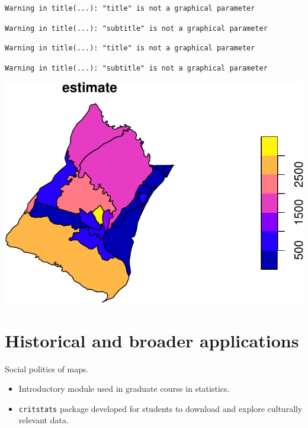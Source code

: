 \documentclass[
  letterpaper,
  DIV=11,
  numbers=noendperiod]{scrartcl}
\begin{document}
\begin{verbatim}
Warning in title(...): "title" is not a graphical parameter
\end{verbatim}

\begin{verbatim}
Warning in title(...): "subtitle" is not a graphical parameter
\end{verbatim}

\begin{verbatim}
Warning in title(...): "title" is not a graphical parameter
\end{verbatim}

\begin{verbatim}
Warning in title(...): "subtitle" is not a graphical parameter
\end{verbatim}

\includegraphics{talk_files/figure-pdf/unnamed-chunk-3-1.pdf}

\hypertarget{historical-and-broader-applications}{%
\section{Historical and broader
applications}\label{historical-and-broader-applications}}

Social politics of maps.

\begin{itemize}
\item
  Introductory module used in graduate course in statistics.
\item
  \texttt{critstats} package developed for students to download and
  explore culturally relevant data.
\end{itemize}
\end{document}
